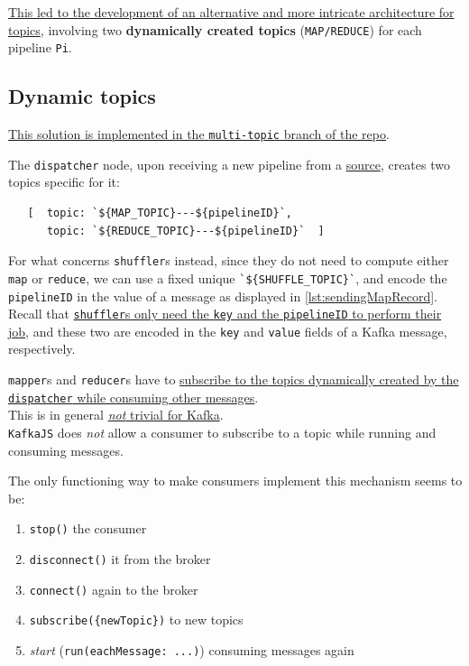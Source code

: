 \ul{This led to the development of an alternative and more intricate architecture for topics}, involving two \textbf{dynamically created topics} (\lstinline|MAP/REDUCE|) for each pipeline \lstinline|Pi|.

\subsection{Dynamic topics}
\ul{This solution is implemented in the \texttt{multi-topic} branch of the repo}.

The \texttt{dispatcher} node, upon receiving a new pipeline from a \ul{source}, creates two topics specific for it:
\begin{lstlisting}
   [  topic: `${MAP_TOPIC}---${pipelineID}`,
      topic: `${REDUCE_TOPIC}---${pipelineID}`  ]
\end{lstlisting}

For what concerns \texttt{shuffler}s instead, since they do not need to compute either \lstinline|map| or \lstinline|reduce|, we can use a fixed unique \lstinline|`${SHUFFLE_TOPIC}`|, and encode the \lstinline|pipelineID| in the value of a message as displayed in \ref{lst:sendingMapRecord}.\\
Recall that \ul{\texttt{shuffler}s only need the \texttt{key} and the \texttt{pipelineID} to perform their job}, and these two are encoded in the \lstinline|key| and \lstinline|value| fields of a Kafka message, respectively. 

\texttt{mapper}s and \texttt{reducer}s have to \ul{subscribe to the topics dynamically created by the \texttt{dispatcher} while consuming other messages}. \\
This is in general \ul{\textit{not} trivial for Kafka}.\\
\lstinline|KafkaJS| does \textit{not} allow a consumer to subscribe to a topic while running and consuming messages.

{The only functioning way to make consumers implement this mechanism seems to be:\ns
\begin{enumerate}
   \item \lstinline|stop()| the consumer 
   \item \lstinline|disconnect()| it from the broker
   \item \lstinline|connect()| again to the broker
   \item \lstinline|subscribe({newTopic})| to new topics
   \item \textit{start} (\lstinline|run(eachMessage: ...)|) consuming messages again
\end{enumerate}}

